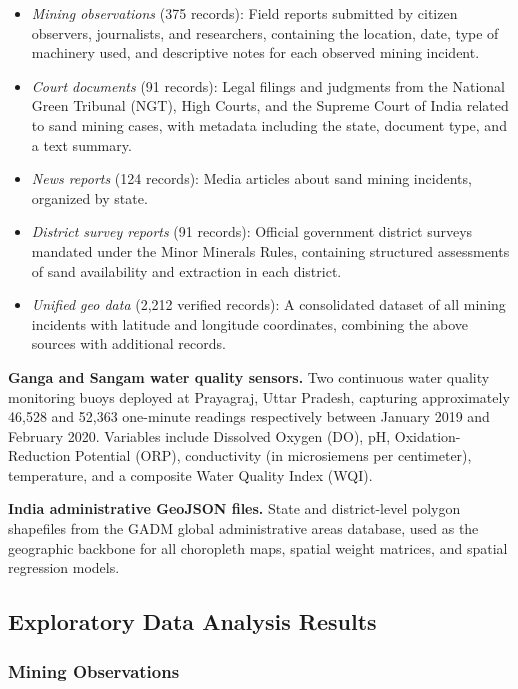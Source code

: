 \documentclass[12pt]{article}
\begin{document}
\begin{itemize}
    \item \textit{Mining observations} (375 records): Field reports submitted by citizen observers, journalists, and researchers, containing the location, date, type of machinery used, and descriptive notes for each observed mining incident.
    \item \textit{Court documents} (91 records): Legal filings and judgments from the National Green Tribunal (NGT), High Courts, and the Supreme Court of India related to sand mining cases, with metadata including the state, document type, and a text summary.
    \item \textit{News reports} (124 records): Media articles about sand mining incidents, organized by state.
    \item \textit{District survey reports} (91 records): Official government district surveys mandated under the Minor Minerals Rules, containing structured assessments of sand availability and extraction in each district.
    \item \textit{Unified geo data} (2,212 verified records): A consolidated dataset of all mining incidents with latitude and longitude coordinates, combining the above sources with additional records.
\end{itemize}

\textbf{Ganga and Sangam water quality sensors.} Two continuous water quality monitoring buoys deployed at Prayagraj, Uttar Pradesh, capturing approximately 46,528 and 52,363 one-minute readings respectively between January 2019 and February 2020. Variables include Dissolved Oxygen (DO), pH, Oxidation-Reduction Potential (ORP), conductivity (in microsiemens per centimeter), temperature, and a composite Water Quality Index (WQI).

\textbf{India administrative GeoJSON files.} State and district-level polygon shapefiles from the GADM global administrative areas database, used as the geographic backbone for all choropleth maps, spatial weight matrices, and spatial regression models.

\subsection{Exploratory Data Analysis Results}

\subsubsection{Mining Observations}
\end{document}
